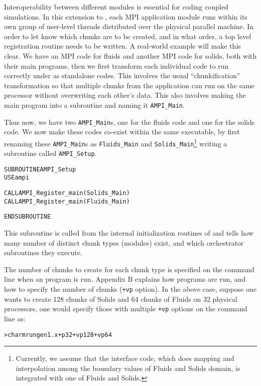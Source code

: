 \documentclass[10pt]{article}
\begin{document}
Interoperability between different modules is essential for coding coupled
simulations.  In this extension to \ampi{}, each MPI application module runs
within its own group of user-level threads distributed over the physical
parallel machine.  In order to let \ampi{} know which chunks are to be created,
and in what order, a top level registration routine needs to be written. A
real-world example will make this clear. We have an MPI code for fluids and
another MPI code for solids, both with their main programs, then we first
transform each individual code to run correctly under \ampi{} as standalone
codes. This involves the usual ``chunkification'' transformation so that
multiple chunks from the application can run on the same processor without
overwriting each other's data. This also involves making the main program into
a subroutine and naming it \texttt{AMPI\_Main}.

Thus now, we have two \texttt{AMPI\_Main}s, one for the fluids code and one for
the solids code. We now make these codes co-exist within the same executable,
by first renaming these \texttt{AMPI\_Main}s as \texttt{Fluids\_Main} and
\texttt{Solids\_Main}\footnote{Currently, we assume that the interface code,
which does mapping and interpolation among the boundary values of Fluids and
Solids domain, is integrated with one of Fluids and Solids.} writing a
subroutine called \texttt{AMPI\_Setup}.

\begin{alltt}
SUBROUTINE AMPI_Setup
  USE ampi

  CALL AMPI_Register_main(Solids_Main)
  CALL AMPI_Register_main(Fluids_Main)

END SUBROUTINE
\end{alltt}

This subroutine is called from the internal initialization routines of \ampi{}
and tells \ampi{} how many number of distinct chunk types (modules) exist, and
which orchestrator subroutines they execute.

The number of chunks to create for each chunk type is specified on the command
line when an \ampi{} program is run. Appendix B explains how \ampi{} programs
are run, and how to specify the number of chunks (\verb|+vp| option). In the
above case, suppose one wants to create 128 chunks of Solids and 64 chunks of
Fluids on 32 physical processors, one would specify those with multiple
\verb|+vp| options on the command line as:

\begin{alltt}
> charmrun gen1.x +p 32 +vp 128 +vp 64
\end{alltt}
\end{document}
